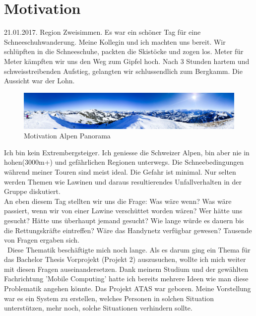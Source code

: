 \documentclass[11pt,english,german]{report}
\theoremstyle{definition}
\begin{document}
\chapter*{Motivation}
21.01.2017. Region Zweisimmen. Es war ein schöner Tag für eine Schneeschuhwanderung. Meine Kollegin und ich machten uns bereit. Wir schlüpften in die Schneeschuhe, packten die Skistöcke und zogen los. Meter für Meter kämpften wir uns den Weg zum Gipfel hoch. Nach 3 Stunden hartem und schweisstreibenden Aufstieg, gelangten wir schlussendlich zum Bergkamm. Die Aussicht war der Lohn.
\begin{figure}[H]
	\centering
	\includegraphics[width=\textwidth]{img/alps/alps_panorama.jpg}
	\caption[Motvation Alpen Panorama]
	{Motivation Alpen Panorama}
\end{figure}
\noindent
Ich bin kein Extrembergsteiger. Ich geniesse die Schweizer Alpen, bin aber nie in hohen(3000m+) und gefährlichen Regionen unterwegs. Die Schneebedingungen während meiner Touren sind meist ideal. Die Gefahr ist minimal. Nur selten werden Themen wie Lawinen und daraus resultierendes Unfallverhalten in der Gruppe diskutiert.\\[0.3cm]
An eben diesem Tag stellten wir uns die Frage: Was wäre wenn? Was wäre passiert, wenn wir von einer Lawine verschüttet worden wären? Wer hätte uns gesucht? Hätte uns überhaupt jemand gesucht? Wie lange würde es dauern bis die Rettungskräfte eintreffen? Wäre das Handynetz verfügbar gewesen? Tausende von Fragen ergaben sich.\\[0.3cm]\
Diese Thematik beschäftigte mich noch lange. Als es darum ging ein Thema für das Bachelor Thesis Vorprojekt (Projekt 2) auszusuchen, wollte ich mich weiter mit diesen Fragen auseinandersetzen. Dank meinem Studium und der gewählten Fachrichtung 'Mobile Computing' hatte ich bereits mehrere Ideen wie man diese Problematik angehen könnte. Das Projekt ATAS war geboren. Meine Vorstellung war es ein System zu erstellen, welches Personen in solchen Situation unterstützen, mehr noch, solche Situationen verhindern sollte.\\[0.3cm]
\end{document}
